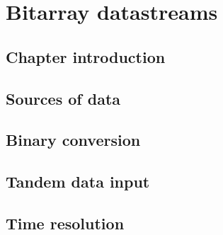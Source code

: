 \chapter{Bitarray datastreams}
\section{Chapter introduction}
\section{Sources of data}
\section{Binary conversion}
\section{Tandem data input}
\section{Time resolution}

